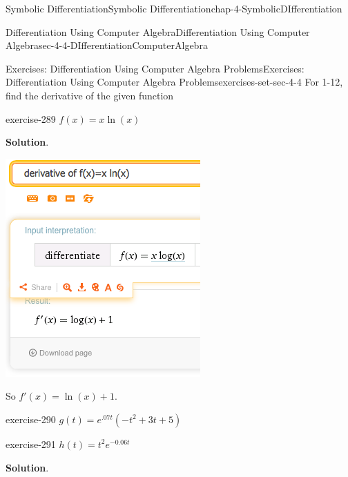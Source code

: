\documentclass[oneside,10pt,]{book}
\numberwithin{equation}{section}
\begin{document}
\begin{chapterptx}{Symbolic Differentiation}{}{Symbolic Differentiation}{}{}{chap-4-SymbolicDIfferentiation}
\begin{sectionptx}{Differentiation Using Computer Algebra}{}{Differentiation Using Computer Algebra}{}{}{sec-4-4-DIfferentiationComputerAlgebra}
\begin{exercises-subsection-numberless}{Exercises: Differentiation Using Computer Algebra Problems}{}{Exercises: Differentiation Using Computer Algebra Problems}{}{}{exercises-set-sec-4-4}
For 1-12, find the derivative of the given function%
\begin{divisionexercise}{1}{}{}{exercise-289}%
\hypertarget{p-1741}{}%
\(f(x)=x \ln(x)\)%
\par\smallskip%
\noindent\textbf{Solution}.\hypertarget{solution-144}{}\quad%
\leavevmode%
\begin{sidebyside}{1}{0.3}{0.3}{0}%
\begin{sbspanel}{0.4}%
\includegraphics[width=1\linewidth]{images/sec4-4-sol1a.png}
\end{sbspanel}%
\end{sidebyside}%
\par
\hypertarget{p-1742}{}%
So  \(f' (x)= \ln(x)+1\).%
\end{divisionexercise}%
\begin{divisionexercise}{2}{}{}{exercise-290}%
\hypertarget{p-1743}{}%
\(g(t)=e^{.07t} (-t^2+3t+5)\)%
\end{divisionexercise}%
\begin{divisionexercise}{3}{}{}{exercise-291}%
\hypertarget{p-1744}{}%
\(h(t)=t^2 e^{-0.06t}\)%
\par\smallskip%
\noindent\textbf{Solution}.\hypertarget{solution-145}{}\quad%
\leavevmode%

\end{divisionexercise}
\end{exercises-subsection-numberless}
\end{sectionptx}
\end{chapterptx}
\end{document}
